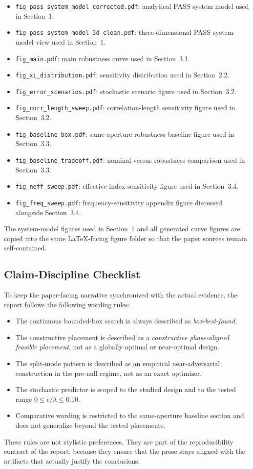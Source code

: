 \begin{itemize}
\item \texttt{fig\_pass\_system\_model\_corrected.pdf}: analytical PASS system model used in Section~1.
\item \texttt{fig\_pass\_system\_model\_3d\_clean.pdf}: three-dimensional PASS system-model view used in Section~1.
\item \texttt{fig\_main.pdf}: main robustness curve used in Section~3.1.
\item \texttt{fig\_xi\_distribution.pdf}: sensitivity distribution used in Section~2.2.
\item \texttt{fig\_error\_scenarios.pdf}: stochastic scenario figure used in Section~3.2.
\item \texttt{fig\_corr\_length\_sweep.pdf}: correlation-length sensitivity figure used in Section~3.2.
\item \texttt{fig\_baseline\_box.pdf}: same-aperture robustness baseline figure used in Section~3.3.
\item \texttt{fig\_baseline\_tradeoff.pdf}: nominal-versus-robustness comparison used in Section~3.3.
\item \texttt{fig\_neff\_sweep.pdf}: effective-index sensitivity figure used in Section~3.4.
\item \texttt{fig\_freq\_sweep.pdf}: frequency-sensitivity appendix figure discussed alongside Section~3.4.
\end{itemize}

The system-model figures used in Section~1 and all generated curve figures are copied into the same LaTeX-facing figure folder so that the paper sources remain self-contained.

\subsection{Claim-Discipline Checklist}

To keep the paper-facing narrative synchronized with the actual evidence, the report follows the following wording rules:

\begin{itemize}
\item The continuous bounded-box search is always described as \emph{box-best-found}.
\item The constructive placement is described as a \emph{constructive phase-aligned feasible placement}, not as a globally optimal or near-optimal design.
\item The split-mode pattern is described as an empirical near-adversarial construction in the pre-null regime, not as an exact optimizer.
\item The stochastic predictor is scoped to the studied design and to the tested range $0 \le \epsilon/\lambda \le 0.10$.
\item Comparative wording is restricted to the same-aperture baseline section and does not generalize beyond the tested placements.
\end{itemize}

These rules are not stylistic preferences. They are part of the reproducibility contract of the report, because they ensure that the prose stays aligned with the artifacts that actually justify the conclusions.

